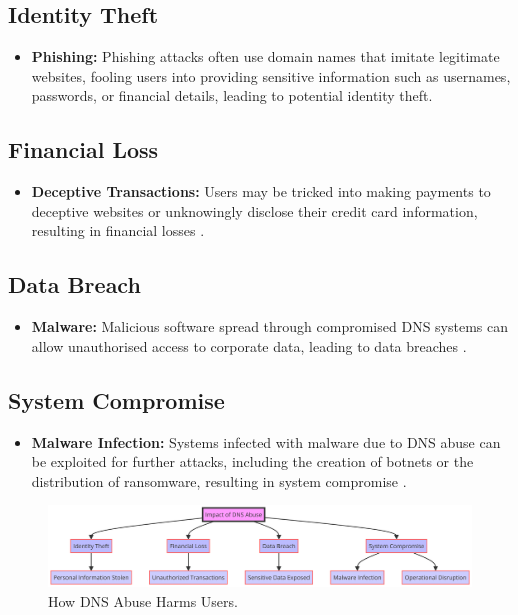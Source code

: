 \subsection{Identity Theft}
\begin{itemize}
    \item \textbf{Phishing:} Phishing attacks often use domain names that imitate legitimate websites, fooling users into providing sensitive information such as usernames, passwords, or financial details, leading to potential identity theft.
\end{itemize}

\subsection{Financial Loss}
\begin{itemize}
    \item \textbf{Deceptive Transactions:} Users may be tricked into making payments to deceptive websites or unknowingly disclose their credit card information, resulting in financial losses \cite{bohme2013economics}.
\end{itemize}

\subsection{Data Breach}
\begin{itemize}
    \item \textbf{Malware:} Malicious software spread through compromised DNS systems can allow unauthorised access to corporate data, leading to data breaches \cite{fowler2016data}.
\end{itemize}

\subsection{System Compromise}
\begin{itemize}
    \item \textbf{Malware Infection:} Systems infected with malware due to DNS abuse can be exploited for further attacks, including the creation of botnets or the distribution of ransomware, resulting in system compromise \cite{saxe2018malware}.
\end{itemize}
\captionsetup{font= footnotesize}
\begin{figure}[H]
\centering
\includegraphics[width=\textwidth]{background/DNSabuseHarm.png}
\caption{How DNS Abuse Harms Users.}
\label{fig:figureFour}
\end{figure}


